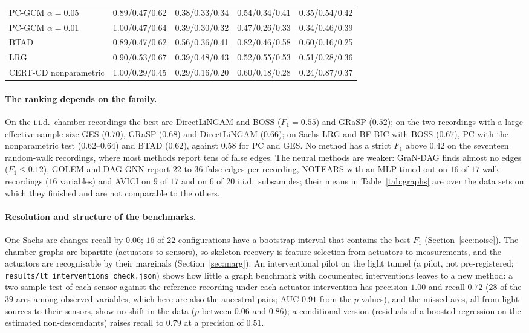\begin{table}[t]
\begin{tabular}{@{}lcccc@{}}
PC-GCM $\alpha=$0.05 & 0.89/0.47/0.62 & 0.38/0.33/0.34 & 0.54/0.34/0.41 & 0.35/0.54/0.42\\
PC-GCM $\alpha=$0.01 & 1.00/0.47/0.64 & 0.39/0.30/0.32 & 0.47/0.26/0.33 & 0.34/0.46/0.39\\
BTAD & 0.89/0.47/0.62 & 0.56/0.36/0.41 & 0.82/0.46/0.58 & 0.60/0.16/0.25\\
LRG & 0.90/0.53/0.67 & 0.39/0.48/0.43 & 0.52/0.55/0.53 & 0.51/0.28/0.36\\
CERT-CD nonparametric & 1.00/0.29/0.45 & 0.29/0.16/0.20 & 0.60/0.18/0.28 & 0.24/0.87/0.37\\
\bottomrule
\end{tabular}
\end{table}

\paragraph{The ranking depends on the family.} On the i.i.d.\ chamber recordings the best are DirectLiNGAM and BOSS ($F_1=0.55$) and GRaSP ($0.52$); on the two recordings with a large effective sample size GES ($0.70$), GRaSP ($0.68$) and DirectLiNGAM ($0.66$); on Sachs LRG and BF-BIC with BOSS ($0.67$), PC with the nonparametric test ($0.62$--$0.64$) and BTAD ($0.62$), against $0.58$ for PC and GES. No method has a strict $F_1$ above $0.42$ on the seventeen random-walk recordings, where most methods report tens of false edges. The neural methods are weaker: GraN-DAG finds almost no edges ($F_1\le0.12$), GOLEM and DAG-GNN report $22$ to $36$ false edges per recording, NOTEARS with an MLP timed out on $16$ of $17$ walk recordings ($16$ variables) and AVICI on $9$ of $17$ and on $6$ of $20$ i.i.d.\ subsamples; their means in Table~\ref{tab:graphs} are over the data sets on which they finished and are not comparable to the others.

\paragraph{Resolution and structure of the benchmarks.} One Sachs arc changes recall by $0.06$; $16$ of $22$ configurations have a bootstrap interval that contains the best $F_1$ (Section~\ref{sec:noise}). The chamber graphs are bipartite (actuators to sensors), so skeleton recovery is feature selection from actuators to measurements, and the actuators are recognisable by their marginals (Section~\ref{sec:marg}). An interventional pilot on the light tunnel (a pilot, not pre-registered; \texttt{results/lt\_interventions\_check.json}) shows how little a graph benchmark with documented interventions leaves to a new method: a two-sample test of each sensor against the reference recording under each actuator intervention has precision $1.00$ and recall $0.72$ ($28$ of the $39$ arcs among observed variables, which here are also the ancestral pairs; AUC $0.91$ from the $p$-values), and the missed arcs, all from light sources to their sensors, show no shift in the data ($p$ between $0.06$ and $0.86$); a conditional version (residuals of a boosted regression on the estimated non-descendants) raises recall to $0.79$ at a precision of $0.51$.

